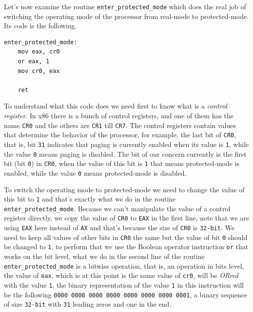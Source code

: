 Let's now examine the routine \lstinline!enter_protected_mode! which
does the real job of switching the operating mode of the processor from
real-mode to protected-mode. Its code is the following.

\begin{lstlisting}
enter_protected_mode:
    mov eax, cr0
    or eax, 1
    mov cr0, eax
    
    ret
\end{lstlisting}

To understand what this code does we need first to know what is a
\emph{control register}. In x86 there is a bunch of control registers,
and one of them has the name \lstinline!CR0! and the others are
\lstinline!CR1! till \lstinline!CR7!. The control registers contain
values that determine the behavior of the processor, for example, the
last bit of \lstinline!CR0!, that is, bit \lstinline!31! indicates that
paging is currently enabled when its value is \lstinline!1!, while the
value \lstinline!0! means paging is disabled. The bit of our concern
currently is the first bit (bit \lstinline!0!) in \lstinline!CR0!, when
the value of this bit is \lstinline!1! that means protected-mode is
enabled, while the value \lstinline!0! means protected-mode is disabled.

To switch the operating mode to protected-mode we need to change the
value of this bit to \lstinline!1! and that's exactly what we do in the
routine \lstinline!enter_protected_mode!. Because we can't manipulate
the value of a control register directly, we copy the value of
\lstinline!CR0! to \lstinline!EAX! in the first line, note that we are
using \lstinline!EAX! here instead of \lstinline!AX! and that's because
the size of \lstinline!CR0! is \lstinline!32-bit!. We need to keep all
values of other bits in \lstinline!CR0! the same but the value of bit
\lstinline!0! should be changed to \lstinline!1!, to perform that we use
the Boolean operator instruction \lstinline!or! that works on the bit
level, what we do in the second line of the routine
\lstinline!enter_protected_mode! is a bitwise operation, that is, an
operation in bits level, the value of \lstinline!eax!, which is at this
point is the same value of \lstinline!cr0!, will be \emph{ORred} with
the value \lstinline!1!, the binary representation of the value
\lstinline!1! in this instruction will be the following
\lstinline!0000 0000 0000 0000 0000 0000 0000 0001!, a binary sequence
of size \lstinline!32-bit! with \lstinline!31! leading zeros and one in
the end.

